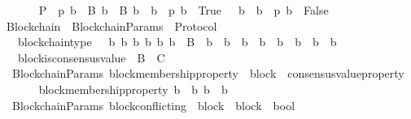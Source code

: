 \begin{isabellebody}
\ \ \isanewline
\ \ \ \ {\isachardoublequoteopen}P\ {\isasymequiv}\ {\isacharbraceleft}p{\isachardot}\ {\isasymexists}{\isacharbang}b\ {\isasymin}\ B{\isachardot}\ {\isasymforall}b{\isacharprime}\ {\isasymin}\ B{\isachardot}\ {\isacharparenleft}b\ {\isasymdownharpoonright}\ b{\isacharprime}\ {\isasymlongrightarrow}\ p\ b{\isacharprime}\ {\isacharequal}\ True{\isacharparenright}\ {\isasymand}\ {\isasymnot}\ {\isacharparenleft}b\ {\isasymdownharpoonright}\ b{\isacharprime}\ {\isasymlongrightarrow}\ p\ b{\isacharprime}\ {\isacharequal}\ False{\isacharparenright}{\isacharbraceright}{\isachardoublequoteclose}\isanewline
\isanewline
\isanewline
{}\isamarkupfalse%
\ Blockchain\ {\isacharequal}\ BlockchainParams\ {\isacharplus}\ Protocol\ {\isacharplus}\isanewline
\ \ \ blockchain{\isacharunderscore}type\ {\isacharcolon}\ {\isachardoublequoteopen}{\isasymforall}\ b\ b{\isacharprime}\ b{\isacharprime}{\isacharprime}{\isachardot}\ {\isacharbraceleft}b{\isacharcomma}\ b{\isacharprime}{\isacharcomma}\ b{\isacharprime}{\isacharprime}{\isacharbraceright}\ {\isasymsubseteq}\ B\ {\isasymlongrightarrow}\ b{\isacharprime}\ {\isasymdownharpoonright}\ b\ {\isasymand}\ b{\isacharprime}{\isacharprime}\ {\isasymdownharpoonright}\ b\ {\isasymlongrightarrow}\ {\isacharparenleft}b{\isacharprime}\ {\isasymdownharpoonright}\ b{\isacharprime}{\isacharprime}\ {\isasymor}\ b{\isacharprime}{\isacharprime}\ {\isasymdownharpoonright}\ b{\isacharprime}{\isacharparenright}{\isachardoublequoteclose}\isanewline
\ \ \ block{\isacharunderscore}is{\isacharunderscore}consensus{\isacharunderscore}value\ {\isacharcolon}\ {\isachardoublequoteopen}B\ {\isacharequal}\ C{\isachardoublequoteclose}\isanewline
\isanewline
{}\isamarkupfalse%
\ {\isacharparenleft}\ BlockchainParams{\isacharparenright}\ block{\isacharunderscore}membership{\isacharunderscore}property\ {\isacharcolon}{\isacharcolon}\ {\isachardoublequoteopen}block\ {\isasymRightarrow}\ consensus{\isacharunderscore}value{\isacharunderscore}property{\isachardoublequoteclose}\isanewline
\ \ \isanewline
\ \ \ \ {\isachardoublequoteopen}block{\isacharunderscore}membership{\isacharunderscore}property\ b\ {\isacharequal}\ {\isacharparenleft}{\isasymlambda}b{\isacharprime}{\isachardot}\ b\ {\isasymdownharpoonright}\ b{\isacharprime}{\isacharparenright}{\isachardoublequoteclose}\isanewline
\isanewline
{}\isamarkupfalse%
\ {\isacharparenleft}\ BlockchainParams{\isacharparenright}\ block{\isacharunderscore}conflicting\ {\isacharcolon}{\isacharcolon}\ {\isachardoublequoteopen}{\isacharparenleft}block\ {\isacharasterisk}\ block{\isacharparenright}\ {\isasymRightarrow}\ bool{\isachardoublequoteclose}\isanewline

\end{isabellebody}
